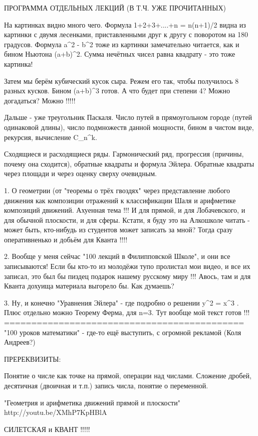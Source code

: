 ПРОГРАММА ОТДЕЛЬНЫХ ЛЕКЦИЙ (В Т.Ч. УЖЕ ПРОЧИТАННЫХ)

На картинках видно много чего. Формула 1+2+3+....+n = n(n+1)/2
видна из картинки с двумя лесенками, приставленными друг к
другу с поворотом на 180 градусов. Формула a^2 - b^2 тоже из
картинки замечательно читается, как и бином Ньютона (a+b)^2.
Сумма нечётных чисел равна квадрату - это тоже картинка!

Затем мы берём кубический кусок сыра. Режем его так, чтобы
получилось 8 разных кусков. Бином (a+b)^3 готов. А что будет
при степени 4? Можно догадаться? Можно !!!!!

Дальше - уже треугольник Паскаля. Число путей в прямоугольном
городе (путей одинаковой длины), число подмножеств данной 
мощности, бином в чистом виде, рекурсия, вычисление C_n^k.


Сходящиеся и расходящиеся ряды. Гармонический ряд, прогрессия
(причины, почему она сходится), обратные квадраты и формула Эйлера.
Обратные квадраты через площади и через оценку сверху очевидным.


1. О геометрии (от "теоремы о трёх гвоздях" через представление любого
движения как композиции отражений к классификации Шаля и арифметике
композиций движений. Ахуенная тема !!! И для прямой, и для Лобачевского,
и для обычной плоскости, и для сферы. Кстати, я буду это на Алкошколе
читать - может быть, кто-нибудь из студентов может записать за мной?
Тогда сразу оперативненько и добьём для Кванта !!!!

2. Вообще у меня сейчас "100 лекций в Филипповской Школе", и они все
записываются! Если бы кто-то из молодёжи тупо пролистал мои видео,
и все их записал, это был бы пиздец подарок нашему русскому миру !!!
Авось, там и для Кванта дохуища материала выгорело бы. Как думаешь?

3. Ну, и конечно "Уравнения Эйлера" - где подробно о решении y^2 = x^3 .
Плюс отдельно можно Теорему Ферма, для n=3. Тут вообще мой текст готов !!!
============================================
"100 уроков математики" - где-то ещё выступить, с огромной рекламой (Коля Андреев?)

ПРЕРЕКВИЗИТЫ:

Понятие о числе как точке на прямой, операции над числами. Сложение
дробей, десятичная (двоичная и т.п.) запись числа, понятие о переменной.

"Геометрия и арифметика движений прямой и плоскости"
http://youtu.be/XMhP7KpHBlA

СИЛЕТСКАЯ и КВАНТ !!!!!

